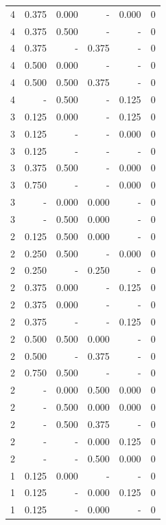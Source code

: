 \documentclass[a4paper]{article}\usepackage[]{graphicx}\usepackage[]{color}
\begin{document}
\begin{table}[ht]
\begin{tabular}{rrrrrr}
  4 & 0.375 & 0.000 & - & 0.000 & 0 \\ 
  4 & 0.375 & 0.500 & - & - & 0 \\ 
   \rowcolor{sosoColor} 4 & 0.375 & - & 0.375 & - & 0 \\ 
  4 & 0.500 & 0.000 & - & - & 0 \\ 
  4 & 0.500 & 0.500 & 0.375 & - & 0 \\ 
  4 & - & 0.500 & - & 0.125 & 0 \\ 
  3 & 0.125 & 0.000 & - & 0.125 & 0 \\ 
   \rowcolor{nullColor} 3 & 0.125 & - & - & 0.000 & 0 \\ 
   \rowcolor{nullColor} 3 & 0.125 & - & - & - & 0 \\ 
  3 & 0.375 & 0.500 & - & 0.000 & 0 \\ 
   \rowcolor{nullColor} 3 & 0.750 & - & - & 0.000 & 0 \\ 
   \rowcolor{goodColor} 3 & - & 0.000 & 0.000 & - & 0 \\ 
   \rowcolor{badColor} 3 & - & 0.500 & 0.000 & - & 0 \\ 
   \rowcolor{badColor} 2 & 0.125 & 0.500 & 0.000 & - & 0 \\ 
  2 & 0.250 & 0.500 & - & 0.000 & 0 \\ 
   \rowcolor{sosoColor} 2 & 0.250 & - & 0.250 & - & 0 \\ 
  2 & 0.375 & 0.000 & - & 0.125 & 0 \\ 
  2 & 0.375 & 0.000 & - & - & 0 \\ 
   \rowcolor{nullColor} 2 & 0.375 & - & - & 0.125 & 0 \\ 
   \rowcolor{badColor} 2 & 0.500 & 0.500 & 0.000 & - & 0 \\ 
   \rowcolor{sosoColor} 2 & 0.500 & - & 0.375 & - & 0 \\ 
  2 & 0.750 & 0.500 & - & - & 0 \\ 
   \rowcolor{badColor} 2 & - & 0.000 & 0.500 & 0.000 & 0 \\ 
   \rowcolor{badColor} 2 & - & 0.500 & 0.000 & 0.000 & 0 \\ 
  2 & - & 0.500 & 0.375 & - & 0 \\ 
   \rowcolor{sosoColor} 2 & - & - & 0.000 & 0.125 & 0 \\ 
   \rowcolor{sosoColor} 2 & - & - & 0.500 & 0.000 & 0 \\ 
  1 & 0.125 & 0.000 & - & - & 0 \\ 
   \rowcolor{sosoColor} 1 & 0.125 & - & 0.000 & 0.125 & 0 \\ 
   \rowcolor{sosoColor} 1 & 0.125 & - & 0.000 & - & 0 \\ 

\end{tabular}
\end{table}
\end{document}
